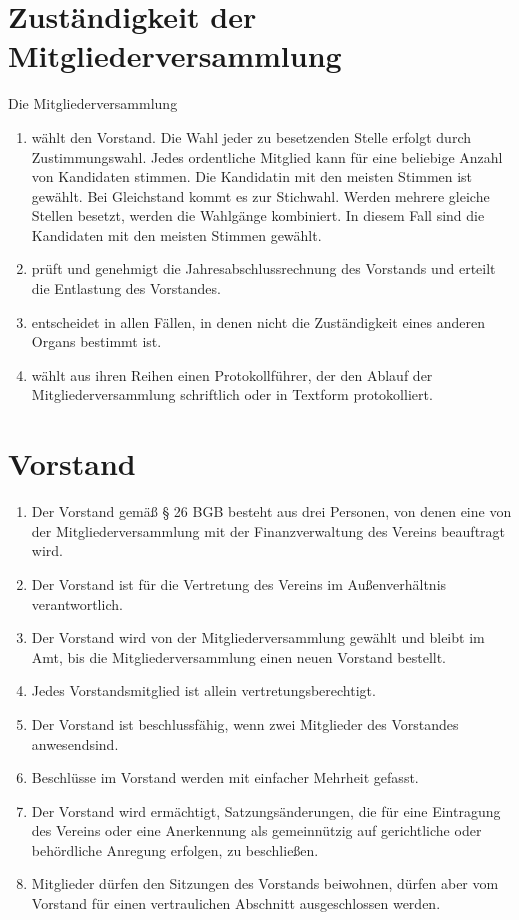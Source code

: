\documentclass[a4paper, 12pt]{scrartcl}
\begin{document}
\section{Zuständigkeit der Mitgliederversammlung}
Die Mitgliederversammlung
\begin{enumerate}
  \item wählt den Vorstand. Die Wahl jeder zu besetzenden Stelle erfolgt durch Zustimmungswahl. Jedes ordentliche Mitglied kann für eine beliebige Anzahl von Kandidaten stimmen. Die Kandidatin mit den meisten Stimmen ist gewählt. Bei Gleichstand kommt es zur Stichwahl. Werden mehrere gleiche Stellen besetzt, werden die Wahlgänge kombiniert. In diesem Fall sind die Kandidaten mit den meisten Stimmen gewählt.
  \item prüft und genehmigt die Jahresabschlussrechnung des Vorstands und erteilt die Entlastung des Vorstandes.
  \item entscheidet in allen Fällen, in denen nicht die Zuständigkeit eines anderen Organs bestimmt ist.
  \item  wählt aus ihren Reihen einen Protokollführer, der den Ablauf der Mitgliederversammlung schriftlich oder in Textform protokolliert.
\end{enumerate}

\section{Vorstand}
\begin{enumerate}
  \item Der Vorstand gemäß § 26 BGB besteht aus drei Personen, von denen eine von der Mitgliederversammlung mit der Finanzverwaltung des Vereins beauftragt wird.
  \item Der Vorstand ist für die Vertretung des Vereins im Außenverhältnis verantwortlich.
  \item Der Vorstand wird von der Mitgliederversammlung gewählt und bleibt im Amt, bis die Mitgliederversammlung einen neuen Vorstand bestellt.
  \item Jedes Vorstandsmitglied ist allein vertretungsberechtigt.
  \item Der Vorstand ist beschlussfähig, wenn zwei Mitglieder des Vorstandes anwesendsind.
  \item Beschlüsse im Vorstand werden mit einfacher Mehrheit gefasst.
  \item Der Vorstand wird ermächtigt, Satzungsänderungen, die für eine Eintragung des Vereins oder eine Anerkennung als gemeinnützig auf gerichtliche oder behördliche Anregung erfolgen, zu beschließen.
  \item Mitglieder dürfen den Sitzungen des Vorstands beiwohnen, dürfen aber vom Vorstand für einen vertraulichen Abschnitt ausgeschlossen werden.
\end{enumerate}
\end{document}
